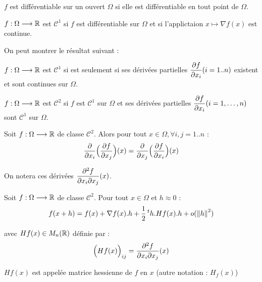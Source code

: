 \begin{fdef}
    $f$ est différentiable sur un ouvert $\Omega$ si elle est différentiable en tout point
    de $\Omega$.
\end{fdef}

\begin{fdef}
    $f : \Omega \longrightarrow \mathbb{R}$ est $\mathcal{C}^1$ si $f$ est différentiable sur
    $\Omega$ et si l'applictaion $x \mapsto \nabla f(x)$ est continue.
\end{fdef}

On peut montrer le résultat suivant :

\begin{lemme}
    $f : \Omega \longrightarrow \mathbb{R}$ est $\mathcal{C}^1$ si est seulement si ses dérivées
    partielles $\displaystyle\frac{\partial f}{\partial x_i}(i=1..n)$ existent et sont continues sur $\Omega$.
\end{lemme}

\begin{fdef}
    $f : \Omega \longrightarrow \mathbb{R}$ est $\mathcal{C}^2$ si $f$ est $\mathcal{C}^1$ sur
    $\Omega$ et ses dérivées partielles $\displaystyle\frac{\partial f}{\partial x_i}(i=1,\dots,n)$ sont $\mathcal{C}^1$
    sur $\Omega$.
\end{fdef}

\begin{lemme}[de Schwarz]
    Soit $f : \Omega \longrightarrow \mathbb{R}$ de classe $\mathcal{C}^2$. Alors pour tout $x \in
    \Omega, \forall i,j = 1..n$ : 
    \[
        \frac{\partial}{\partial x_i} \Big( \displaystyle\frac{\partial f}{\partial x_j} \Big) (x) =
        \frac{\partial}{\partial x_j} \Big( \displaystyle\frac{\partial f}{\partial x_i} \Big) (x)
    \]
\end{lemme}

\begin{remark}
    On notera ces dérivées $\displaystyle\frac{\partial^2f}{\partial x_i \partial x_j}(x)$.
\end{remark}

\begin{ftheo}
    Soit $f : \Omega \longrightarrow \mathbb{R}$ de classe $\mathcal{C}^2$. Pour tout $x \in \Omega$
    et $h \approx 0$ : 
\[
    f(x+h) = f(x) + \nabla f(x).h + \frac{1}{2} \,^th . Hf(x) . h + o(\left\lVert h\right\rVert^2)
\]

    avec $Hf(x) \in M_n(\mathbb{R})$ définie par :
    \[
        \Big( Hf(x) \Big)_{ij} = \displaystyle\frac{\partial^2f}{\partial x_i \partial x_j}(x)
    \]

    $Hf(x)$ est appelée matrice hessienne de $f$ en $x$ (autre notation : $H_f(x)$)
\end{ftheo}

